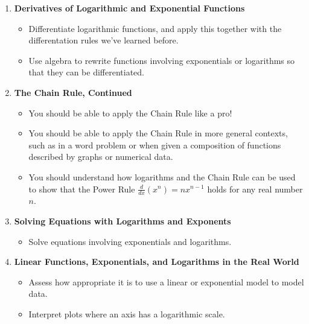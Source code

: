 \documentclass{article}
\begin{document}
\begin{enumerate}
\begin{itemize}
  \end{itemize}

\item \textbf{Derivatives of Logarithmic and Exponential Functions} %
  \begin{itemize}
  \item Differentiate logarithmic functions, and apply this together with the differentation rules we've learned before. 

  \item Use algebra to rewrite functions involving exponentials or logarithms so that they can be differentiated.

  \end{itemize}
\item \textbf{The Chain Rule, Continued} %
  \begin{itemize}
 \item You should be able to apply the Chain Rule like a pro!

\item You should be able to apply the Chain Rule in more general contexts,
  such as in a word problem or when given a composition of functions
  described by graphs or numerical data.

\item You should understand how logarithms and the Chain Rule can be used
  to show that the Power Rule $\tfrac{d}{dx} \left( x^n \right) =
  nx^{n-1}$ holds for any real number $n$. 


  \end{itemize}
\item \textbf{Solving Equations with Logarithms and Exponents} %
  \begin{itemize}
  \item Solve equations involving exponentials and logarithms.

  \end{itemize}

\item \textbf{Linear Functions, Exponentials, and Logarithms in the Real World} %
  \begin{itemize}
  \item Assess how appropriate it is to use a linear or exponential model to model data.

  \item Interpret plots where an axis has a logarithmic scale. 

  \end{itemize}



\end{enumerate}
\end{document}
